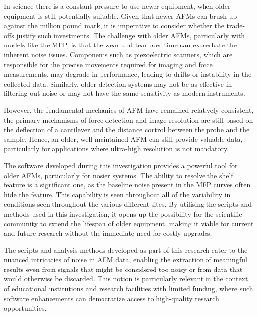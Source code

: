 In science there is a constant pressure to use newer equipment, when older equipment is still potentially suitable. Given that newer AFMs can brush up against the million pound mark, it is imperative to consider whether the trade-offs justify such investments. The challenge with older AFMs, particularly with models like the MFP, is that the wear and tear over time can exacerbate the inherent noise issues. Components such as piezoelectric scanners, which are responsible for the precise movements required for imaging and force measurements, may degrade in performance, leading to drifts or instability in the collected data. Similarly, older detection systems may not be as effective in filtering out noise or may not have the same sensitivity as modern instruments.

However, the fundamental mechanics of AFM have remained relatively consistent, the primary mechanisms of force detection and image resolution are still based on the deflection of a cantilever and the distance control between the probe and the sample. Hence, an older, well-maintained AFM can still provide valuable data, particularly for applications where ultra-high resolution is not mandatory.

The software developed during this investigation provides a powerful tool for older AFMs, particularly for nosier systems. The ability to resolve the shelf feature is a significant one, as the baseline noise present in the MFP curves often hide the feature. This capability is seen throughout all of the variability in conditions seen throughout the various different sites. By utilising the scripts and methods used in this investigation, it opens up the possibility for the scientific community to extend the lifespan of older equipment, making it viable for current and future research without the immediate need for costly upgrades.

The scripts and analysis methods developed as part of this research cater to the nuanced intricacies of noise in AFM data, enabling the extraction of meaningful results even from signals that might be considered too noisy or from data that would otherwise be discarded. This notion is particularly relevant in the context of educational institutions and research facilities with limited funding, where such software enhancements can democratize access to high-quality research opportunities. 

